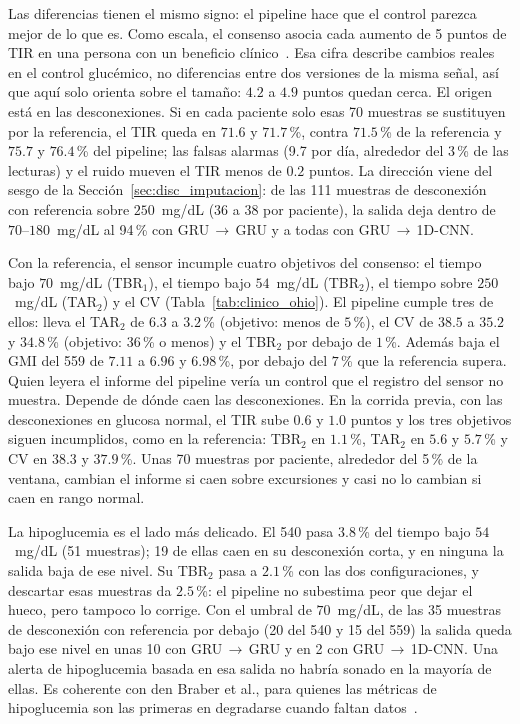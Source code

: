 \documentclass{report}
\begin{document}
Las diferencias tienen el mismo signo: el pipeline hace que el control parezca mejor de lo que es. Como escala, el consenso asocia cada aumento de 5 puntos de TIR en una persona con un beneficio clínico~\cite{battelino2019}. Esa cifra describe cambios reales en el control glucémico, no diferencias entre dos versiones de la misma señal, así que aquí solo orienta sobre el tamaño: $4.2$ a $4.9$ puntos quedan cerca. El origen está en las desconexiones. Si en cada paciente solo esas 70 muestras se sustituyen por la referencia, el TIR queda en $71.6$ y $71.7$\,\%, contra $71.5$\,\% de la referencia y $75.7$ y $76.4$\,\% del pipeline; las falsas alarmas (9.7 por día, alrededor del 3\,\% de las lecturas) y el ruido mueven el TIR menos de $0.2$ puntos. La dirección viene del sesgo de la Sección~\ref{sec:disc_imputacion}: de las 111 muestras de desconexión con referencia sobre $250$~mg/dL (36 a 38 por paciente), la salida deja dentro de $70$--$180$~mg/dL al 94\,\% con GRU\,$\rightarrow$\,GRU y a todas con GRU\,$\rightarrow$\,1D-CNN.

Con la referencia, el sensor incumple cuatro objetivos del consenso: el tiempo bajo $70$~mg/dL (TBR$_1$), el tiempo bajo $54$~mg/dL (TBR$_2$), el tiempo sobre $250$~mg/dL (TAR$_2$) y el CV (Tabla~\ref{tab:clinico_ohio}). El pipeline cumple tres de ellos: lleva el TAR$_2$ de $6.3$ a $3.2$\,\% (objetivo: menos de $5$\,\%), el CV de $38.5$ a $35.2$ y $34.8$\,\% (objetivo: $36$\,\% o menos) y el TBR$_2$ por debajo de $1$\,\%. Además baja el GMI del 559 de $7.11$ a $6.96$ y $6.98$\,\%, por debajo del $7$\,\% que la referencia supera. Quien leyera el informe del pipeline vería un control que el registro del sensor no muestra. Depende de dónde caen las desconexiones. En la corrida previa, con las desconexiones en glucosa normal, el TIR sube $0.6$ y $1.0$ puntos y los tres objetivos siguen incumplidos, como en la referencia: TBR$_2$ en $1.1$\,\%, TAR$_2$ en $5.6$ y $5.7$\,\% y CV en $38.3$ y $37.9$\,\%. Unas 70 muestras por paciente, alrededor del 5\,\% de la ventana, cambian el informe si caen sobre excursiones y casi no lo cambian si caen en rango normal.

La hipoglucemia es el lado más delicado. El 540 pasa $3.8$\,\% del tiempo bajo $54$~mg/dL (51 muestras); 19 de ellas caen en su desconexión corta, y en ninguna la salida baja de ese nivel. Su TBR$_2$ pasa a $2.1$\,\% con las dos configuraciones, y descartar esas muestras da $2.5$\,\%: el pipeline no subestima peor que dejar el hueco, pero tampoco lo corrige. Con el umbral de $70$~mg/dL, de las 35 muestras de desconexión con referencia por debajo (20 del 540 y 15 del 559) la salida queda bajo ese nivel en unas 10 con GRU\,$\rightarrow$\,GRU y en 2 con GRU\,$\rightarrow$\,1D-CNN. Una alerta de hipoglucemia basada en esa salida no habría sonado en la mayoría de ellas. Es coherente con den Braber et al., para quienes las métricas de hipoglucemia son las primeras en degradarse cuando faltan datos~\cite{denbraber2024}.
\end{document}
